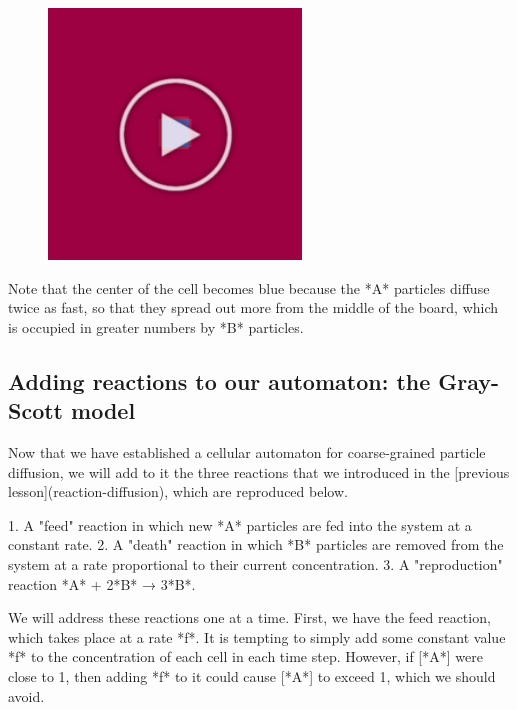 {{\begin{figure}[h]
\centering
\mySfFamily
\includegraphics[width = 0.6\textwidth]{../assets/images/600px/diffusion_movie_first_frame.png}
\caption{}
\label{fig:diffusion_movie_first_frame}
\end{figure}

Note that the center of the cell becomes blue because the *A* particles diffuse twice as fast, so that they spread out more from the middle of the board, which is occupied in greater numbers by *B* particles.

\FloatBarrier
{}
\subsection{Adding reactions to our automaton: the Gray-Scott model}

Now that we have established a cellular automaton for coarse-grained particle diffusion, we will add to it the three reactions that we introduced in the [previous lesson](reaction-diffusion), which are reproduced below.

1. A "feed" reaction in which new *A* particles are fed into the system at a constant rate.
2. A "death" reaction in which *B* particles are removed from the system at a rate proportional to their current concentration.
3. A "reproduction" reaction *A* + 2*B* → 3*B*.

\begin{qbox}\end{qbox}

We will address these reactions one at a time. First, we have the feed reaction, which takes place at a rate *f*. It is tempting to simply add some constant value *f* to the concentration of each cell in each time step. However, if [*A*] were close to 1, then adding *f* to it could cause [*A*] to exceed 1, which we should avoid.

}}
